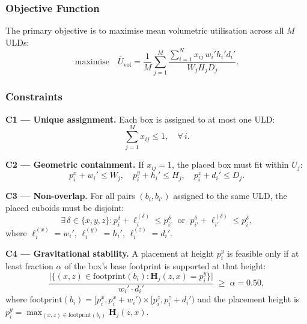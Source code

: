 \documentclass[12pt,a4paper]{article}
\begin{document}
\subsubsection{Objective Function}

The primary objective is to maximise mean volumetric utilisation
across all $M$ ULDs:
\begin{equation}
\label{eq:objective}
\text{maximise} \quad
\bar{U}_{\mathrm{vol}}
= \frac{1}{M} \sum_{j=1}^{M}
  \frac{\displaystyle\sum_{i=1}^{N} x_{ij}\, w_i' h_i' d_i'}
       {W_j H_j D_j}.
\end{equation}

\subsubsection{Constraints}

\textbf{C1 --- Unique assignment.}
Each box is assigned to at most one ULD:
\begin{equation}
\label{eq:c1}
\sum_{j=1}^{M} x_{ij} \leq 1, \quad \forall\, i.
\end{equation}

\textbf{C2 --- Geometric containment.}
If $x_{ij}=1$, the placed box must fit within $U_j$:
\begin{equation}
\label{eq:c2}
p_i^x + w_i' \leq W_j,\quad
p_i^y + h_i' \leq H_j,\quad
p_i^z + d_i' \leq D_j.
\end{equation}

\textbf{C3 --- Non-overlap.}
For all pairs $(b_i, b_{i'})$ assigned to the same ULD, the placed
cuboids must be disjoint:
\begin{equation}
\label{eq:c3}
\exists\,\delta\in\{x,y,z\} :
p_i^{\delta} + \ell_i^{(\delta)} \leq p_{i'}^{\delta}
\;\text{ or }\;
p_{i'}^{\delta} + \ell_{i'}^{(\delta)} \leq p_i^{\delta},
\end{equation}
where $\ell_i^{(x)}=w_i'$, $\ell_i^{(y)}=h_i'$, $\ell_i^{(z)}=d_i'$.

\textbf{C4 --- Gravitational stability.}
A placement at height $p_i^y$ is feasible only if at least fraction
$\alpha$ of the box's base footprint is supported at that height:
\begin{equation}
\label{eq:stability}
\frac{\bigl|\{(x,z)\in\mathrm{footprint}(b_i) :
              \mathbf{H}_j(z,x)=p_i^y\}\bigr|}
     {w_i' \cdot d_i'}
\;\geq\; \alpha = 0.50,
\end{equation}
where $\mathrm{footprint}(b_i) = [p_i^x, p_i^x+w_i') \times
[p_i^z, p_i^z+d_i')$ and the placement height is
$p_i^y = \max_{(x,z)\in\mathrm{footprint}(b_i)} \mathbf{H}_j(z,x)$.
\end{document}
